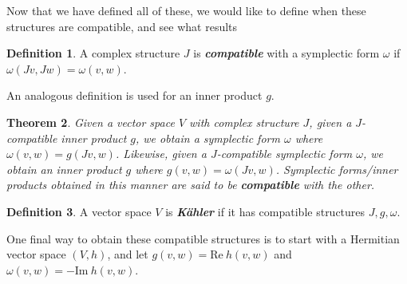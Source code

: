 \documentclass[psamsfonts]{amsart}
\newtheorem{thm}{Theorem}[section]
\theoremstyle{definition}
\newtheorem{defn}[thm]{Definition}
\theoremstyle{remark}
\newcommand{\ib}[1]{\textbf{\textit{#1}}}
\begin{document}
Now that we have defined all of these, we would like to define when these structures are compatible, and see what results
%
\begin{defn}
A complex structure $J$ is \ib{compatible} with a symplectic form $\omega$ if $\omega(Jv,Jw) = \omega(v,w)$.
\end{defn}
%
An analogous definition is used for an inner product $g$.
%
\begin{thm}
Given a vector space $V$ with complex structure $J$, given a $J$-compatible inner product $g$, we obtain a symplectic form $\omega$ where $\omega(v,w) = g(Jv,w)$. Likewise, given a $J$-compatible symplectic form $\omega$, we obtain an inner product $g$ where $g(v,w) = \omega(Jv,w)$. Symplectic forms/inner products obtained in this manner are said to be \ib{compatible} with the other.
\end{thm}
%
\begin{defn}
A vector space $V$ is \ib{K\"ahler} if it has compatible structures $J,g,\omega$.
\end{defn}
%
One final way to obtain these compatible structures is to start with a Hermitian vector space $(V,h)$, and let $g(v,w) = \text{Re}~h(v,w)$ and $\omega(v,w) = - \text{Im}~h(v,w)$.
%
\setcounter{section}{1}
%
\end{document}

